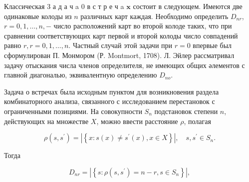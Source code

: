 \documentclass[10pt]{article}
\begin{document}
Классическая 3 а д а ч a 0 в с т р е ч a $\mathbf{x}$ состоит в следующем. Имеются две одинаковые колоды из $n$ различных карт каждая. Необходимо определить $D_{n r}$, $r=0,1, \ldots, n,-$ число расположений карт во второй колоде таких, что при сравнении соответствующих карт первой и второй колоды число совпадений равно $r, r=0,1, \ldots, n$. Частный случай этой задачи при $r=0$ впервые был сформулирован П. Монмором (Р. Montmort, 1708). Л. Эйлер рассматривал задачу отыскания числа членов определителя, не имеющих общих әлементов с главной диагональю, эквивалентную определению $D_{n o}$.



Задача о встречах была исходным пунктом для возникновения раздела комбинаторного анализа, связанного с исследованием перестановок с ограниченными позициями. На совокупности $S_{n}$ подстановок степени $n$, действующих на множестве $X$, можно ввести расстояние $\rho$, полагая



\[

\rho\left(s, s^{\prime}\right)=\left|\left\{x: s(x) \neq s^{\prime}(x), x \in X\right\}\right|, \quad s, s^{\prime} \in S_{n} .

\]



Тогда



\[

D_{n r}=\left|\left\{s: \rho\left(s, s^{\prime}\right)=n-r, s \in S_{n}\right\}\right|,

\]
\end{document}

